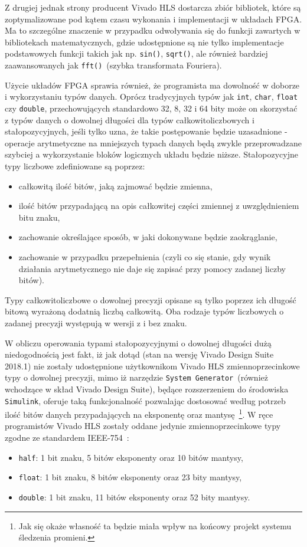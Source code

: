 Z drugiej jednak strony producent Vivado HLS dostarcza zbiór bibliotek, które są zoptymalizowane pod kątem czasu wykonania i implementacji w układach FPGA. Ma to szczególne znaczenie w przypadku odwoływania się do funkcji zawartych w bibliotekach matematycznych, gdzie udostępnione są nie tylko implementacje podstawowych funkcji takich jak np. \texttt{sin()}, \texttt{sqrt()}, ale również bardziej zaawansowanych jak \texttt{fft()}~(szybka transformata Fouriera). 

Użycie układów FPGA sprawia również, że programista ma dowolność w doborze i wykorzystaniu typów danych. Oprócz tradycyjnych typów jak \texttt{int}, \texttt{char}, \texttt{float} czy \texttt{double}, przechowujących standardowo 32, 8, 32 i 64 bity może on skorzystać z typów danych o dowolnej długości dla typów całkowitoliczbowych i stałopozycyjnych, jeśli tylko uzna, że takie postępowanie będzie uzasadnione - operacje arytmetyczne na mniejszych typach danych będą zwykle przeprowadzane szybciej a wykorzystanie bloków logicznych układu będzie niższe. Stałopozycyjne typy liczbowe zdefiniowane są poprzez:
\begin{itemize}
\item całkowitą ilość bitów, jaką zajmować będzie zmienna,
\item ilość bitów przypadającą na opis całkowitej części zmiennej z uwzględnieniem bitu znaku,
\item zachowanie określające sposób, w jaki dokonywane będzie zaokrąglanie,
\item zachowanie w przypadku przepełnienia (czyli co się stanie, gdy wynik działania arytmetycznego nie daje się zapisać przy pomocy zadanej liczby bitów).
\end{itemize}
Typy całkowitoliczbowe o dowolnej precyzji opisane są tylko poprzez ich długość bitową wyrażoną dodatnią liczbą całkowitą. Oba rodzaje typów liczbowych o zadanej precyzji występują w wersji z i bez znaku.

W obliczu operowania typami stałopozycyjnymi o dowolnej długości dużą niedogodnością jest fakt, iż jak dotąd (stan na wersję Vivado Design Suite 2018.1) nie zostały udostępnione użytkownikom Vivado HLS zmiennoprzecinkowe typy o dowolnej precyzji, mimo iż narzędzie \texttt{System Generator}~(również wchodzące w skład Vivado Design Suite), będące rozszerzeniem do środowiska \texttt{Simulink}, oferuje taką funkcjonalność pozwalając dostosować według potrzeb ilość bitów danych przypadających na eksponentę oraz mantysę~\cite{Designing_with_Xilinx}\footnote{Jak się okaże własność ta będzie miała wpływ na końcowy projekt systemu śledzenia promieni.}. W ręce programistów Vivado HLS zostały oddane jedynie zmiennoprzecinkowe typy zgodne ze standardem IEEE-754~\cite{IEEE_754}:
\begin{itemize}
\item \texttt{half}: 1 bit znaku, 5 bitów eksponenty oraz 10 bitów mantysy,
\item \texttt{float}: 1 bit znaku, 8 bitów eksponenty oraz 23 bity mantysy,
\item \texttt{double}: 1 bit znaku, 11 bitów eksponenty oraz 52 bity mantysy.
\end{itemize}


